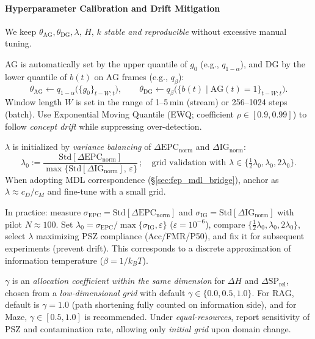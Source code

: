 \documentclass[12pt]{article}
\newcommand{\gednorm}{\Delta\mathrm{EPC}_{\mathrm{norm}}}
\newcommand{\ignorm}{\Delta\mathrm{IG}_{\mathrm{norm}}}
\begin{document}
\paragraph{Hyperparameter Calibration and Drift Mitigation}\label{sec:hyperparam_drift}
We keep $\theta_{\mathrm{AG}},\theta_{\mathrm{DG}},\lambda,\,H,\,k$ \emph{stable and reproducible} without excessive manual tuning.
\begin{description}[leftmargin=1.6em]
  \item[Quantile Calibration of Thresholds] \; AG is automatically set by the upper quantile of $g_0$ (e.g., $q_{1-\alpha}$), and DG by the lower quantile of $b(t)$ on AG frames (e.g., $q_{\beta}$):
  \[
    \theta_{\mathrm{AG}} \leftarrow q_{1-\alpha}\big(\{g_0\}_{t-W:t}\big),\qquad
    \theta_{\mathrm{DG}} \leftarrow q_{\beta}\big(\{b(t)\mid \mathrm{AG}(t){=}1\}_{t-W:t}\big).
  \]
  Window length $W$ is set in the range of 1--5\,min (stream) or 256--1024 steps (batch). Use Exponential Moving Quantile (EWQ; coefficient $\rho\in[0.9,0.99]$) to follow \emph{concept drift} while suppressing over-detection.
  \item[Scaling ($\lambda$)] \; $\lambda$ is initialized by \emph{variance balancing} of $\gednorm$ and $\ignorm$:
  \[
    \lambda_0 := \frac{\mathrm{Std}[\gednorm]}{\max\{\mathrm{Std}[\ignorm],\,\varepsilon\}}\,;\quad \text{grid validation with } \lambda\in\{\tfrac{1}{2}\lambda_0,\lambda_0,2\lambda_0\}.
  \]
  When adopting MDL correspondence (\S\ref{sec:fep_mdl_bridge}), anchor as $\lambda\approx c_D/c_M$ and fine-tune with a small grid.
  \item[Determination Procedure for $\lambda$] \; In practice: measure $\sigma_{\mathrm{EPC}}{=}\mathrm{Std}[\gednorm]$ and $\sigma_{\mathrm{IG}}{=}\mathrm{Std}[\ignorm]$ with pilot $N{\approx}100$. Set $\lambda_0{=}\sigma_{\mathrm{EPC}}/\max\{\sigma_{\mathrm{IG}},\varepsilon\}$ ($\varepsilon{=}10^{-6}$), compare $\{\tfrac{1}{2}\lambda_0,\lambda_0,2\lambda_0\}$, select $\lambda$ maximizing PSZ compliance (Acc/FMR/P50), and fix it for subsequent experiments (prevent drift). This corresponds to a discrete approximation of information temperature ($\beta{=}1/k_BT$).
  \item[Handling $\gamma$] \; $\gamma$ is an \emph{allocation coefficient within the same dimension} for $\Delta H$ and $\Delta\mathrm{SP}_{\mathrm{rel}}$, chosen from a \emph{low-dimensional grid} with default $\gamma\in\{0.0,0.5,1.0\}$. For RAG, default is $\gamma{=}1.0$ (path shortening fully counted on information side), and for Maze, $\gamma{\in}[0.5,1.0]$ is recommended. Under \emph{equal-resources}, report sensitivity of PSZ and contamination rate, allowing only \emph{initial grid} upon domain change.

\end{description}
\end{document}
